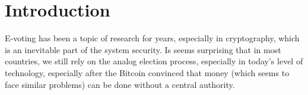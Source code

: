 \documentclass[runningheads]{llncs}
\begin{document}
\section{Introduction}
E-voting has been a topic of research for years, especially in cryptography, which is an inevitable part of the system security. Is seems surprising that in most countries, we still rely on the analog election process, especially in today's level of technology, especially after the Bitcoin convinced that money (which seems to face similar problems) can be done without a central authority. 


\end{document}
